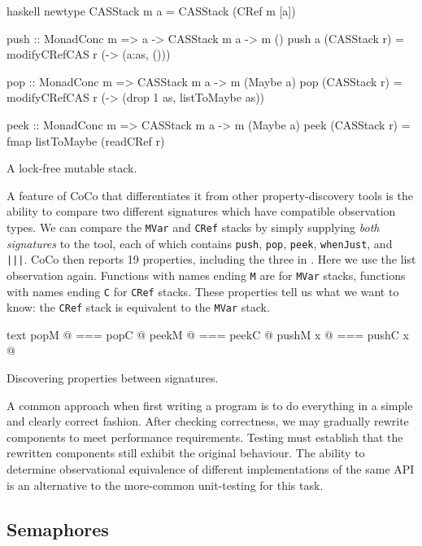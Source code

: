 \begin{listing}
\centering
\begin{cminted}{haskell}
newtype CASStack m a = CASStack (CRef m [a])

push :: MonadConc m => a -> CASStack m a -> m ()
push a (CASStack r) = modifyCRefCAS r (\as -> (a:as, ()))

pop :: MonadConc m => CASStack m a -> m (Maybe a)
pop (CASStack r) = modifyCRefCAS r (\as -> (drop 1 as, listToMaybe as))

peek :: MonadConc m => CASStack m a -> m (Maybe a)
peek (CASStack r) = fmap listToMaybe (readCRef r)
\end{cminted}
\caption{A lock-free mutable stack.}
\label{lst:crefstack}
\end{listing}

A feature of CoCo that differentiates it from other property-discovery
tools is the ability to compare two different signatures which have
compatible observation types.  We can compare the \verb|MVar| and
\verb|CRef| stacks by simply supplying \emph{both signatures} to the
tool, each of which contains \verb|push|, \verb|pop|, \verb|peek|,
\verb|whenJust|, and \verb#|||#.  CoCo then reports 19 properties,
including the three in .  Here we use the list
observation again.  Functions with names ending \verb|M| are for
\verb|MVar| stacks, functions with names ending \verb|C| for
\verb|CRef| stacks.  These properties tell us what we want to know:
the \verb|CRef| stack is equivalent to the \verb|MVar| stack.

\begin{listing}
\centering
\begin{cminted}{text}
   popM @  ===  popC @
  peekM @  ===  peekC @
pushM x @  ===  pushC x @
\end{cminted}
\caption{Discovering properties between signatures.}\label{lst:stacks}
\end{listing}

A common approach when first writing a program is to do everything in
a simple and clearly correct fashion.  After checking correctness, we
may gradually rewrite components to meet performance requirements.
Testing must establish that the rewritten components still exhibit the
original behaviour.  The ability to determine observational
equivalence of different implementations of the same API is an
alternative to the more-common unit-testing for this
task\cite{he1986}.

\subsection{Semaphores}
\label{sec:coco-cases-semaphore}

